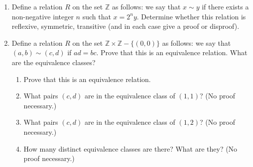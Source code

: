 \begin{enumerate}
\item Define a relation $R$ on the set $\mathbb{Z}$ as follows: we say that $x \sim y$ if there exists a non-negative integer $n$ such that $x = 2^ny$. Determine whether this relation is reflexive, symmetric, transitive (and in each case give a proof or disproof).

\item Define a relation $R$ on the set $\mathbb{Z}\times \mathbb{Z} - \{(0,0)\}$ as follows: we say that $(a,b) \sim (c,d)$ if $ad = bc$. Prove that this is an equivalence relation. What are the equivalence classes?
 \begin{enumerate}
 \item Prove that this is an equivalence relation.
 \item What pairs $(c,d)$ are in the equivalence class of $(1,1)$? (No proof necessary.)
 \item What pairs $(c,d)$ are in the equivalence class of $(1,2)$? (No proof necessary.)   
 \item How many distinct equivalence classes are there? What are they? (No proof necessary.)
 \end{enumerate} 
  
\end{enumerate}




